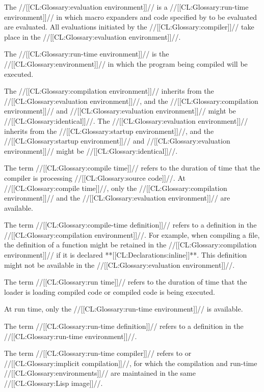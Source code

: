 The //[[CL:Glossary:evaluation environment]]// is a //[[CL:Glossary:run-time environment]]//
in which macro expanders and code specified by 
to be evaluated are evaluated.  All evaluations initiated by the
//[[CL:Glossary:compiler]]// take place in the //[[CL:Glossary:evaluation environment]]//.


The //[[CL:Glossary:run-time environment]]// is the 
//[[CL:Glossary:environment]]// in which the program being compiled will be executed.


The //[[CL:Glossary:compilation environment]]// inherits from
the //[[CL:Glossary:evaluation environment]]//,
and the //[[CL:Glossary:compilation environment]]// and //[[CL:Glossary:evaluation environment]]// 
might be //[[CL:Glossary:identical]]//.
The //[[CL:Glossary:evaluation environment]]// inherits from
the //[[CL:Glossary:startup environment]]//, 
and the //[[CL:Glossary:startup environment]]// and //[[CL:Glossary:evaluation environment]]// 
might be //[[CL:Glossary:identical]]//.



The term //[[CL:Glossary:compile time]]// refers to the duration of time that
the compiler is processing //[[CL:Glossary:source code]]//.
At //[[CL:Glossary:compile time]]//,
only the //[[CL:Glossary:compilation environment]]// 
and  the //[[CL:Glossary:evaluation environment]]//
are available.


The term //[[CL:Glossary:compile-time definition]]// refers to a definition in
the //[[CL:Glossary:compilation environment]]//.
For example, when compiling a file, 
the definition of a function might be retained in the //[[CL:Glossary:compilation environment]]// 
if it is declared **[[CL:Declarations:inline]]**. 
This definition might not be available in the //[[CL:Glossary:evaluation environment]]//.


The term //[[CL:Glossary:run time]]// refers to the duration of time that the
loader is loading compiled code or compiled code is being executed.

At run time, only the //[[CL:Glossary:run-time environment]]// is available.


The term //[[CL:Glossary:run-time definition]]// refers to a definition in the
//[[CL:Glossary:run-time environment]]//.


The term //[[CL:Glossary:run-time compiler]]// refers to 
or //[[CL:Glossary:implicit compilation]]//, for which the compilation and run-time 
//[[CL:Glossary:environments]]// are maintained in the same //[[CL:Glossary:Lisp image]]//.

